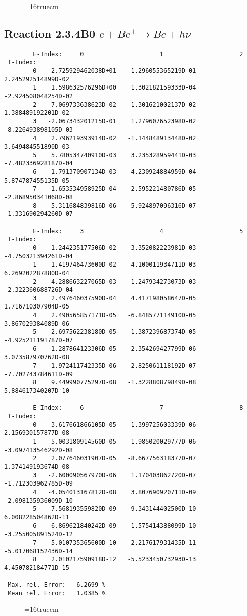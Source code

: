 \documentclass[12pt]{article}
\begin{document}
\begin{figure} \label{2.3.2C}
\epsfxsize=16truecm
\end{figure}
\newpage

\subsection{
Reaction 2.3.4B0  $e + Be^+ \rightarrow Be + h\nu$
}


\begin{small}\begin{verbatim}
        E-Index:     0                     1                     2
 T-Index:
        0   -2.725929462038D+01   -1.296055365219D-01    2.245292514899D-02
        1    1.598632576296D+00    1.302182159333D-04   -2.924508048254D-02
        2   -7.069733638623D-02    1.301621002137D-02    1.388489192201D-02
        3   -2.067343201215D-01    1.279607652398D-02   -8.226493898105D-03
        4    2.796219393914D-02   -1.144848913448D-02    3.649484551890D-03
        5    5.780534740910D-03    3.235328959441D-03   -7.482336928187D-04
        6   -1.791370907134D-03   -4.230924884959D-04    5.874787455135D-05
        7    1.653534958925D-04    2.595221480786D-05   -2.868950341068D-08
        8   -5.311684839816D-06   -5.924897096316D-07   -1.331690294260D-07

        E-Index:     3                     4                     5
 T-Index:
        0   -1.244235177506D-02    3.352082223981D-03   -4.750321394261D-04
        1    1.419746473600D-02   -4.100011934711D-03    6.269202287880D-04
        2   -4.288663227065D-03    1.247934273073D-03   -2.322360688726D-04
        3    2.497646037590D-04    4.417198058647D-05    1.716710307904D-05
        4    2.490565857171D-05   -6.848577114910D-05    3.867029384089D-06
        5   -2.697562238180D-05    1.387239687374D-05   -4.925211191787D-07
        6    1.287864123306D-05   -2.354269427799D-06    3.073587970762D-08
        7   -1.972411742335D-06    2.825061118192D-07   -7.702743784611D-09
        8    9.449990775297D-08   -1.322880879849D-08    5.884617340207D-10

        E-Index:     6                     7                     8
 T-Index:
        0    3.617661866105D-05   -1.399725603339D-06    2.156930157877D-08
        1   -5.003180914560D-05    1.985020029777D-06   -3.097413546292D-08
        2    2.077646031907D-05   -8.667756318377D-07    1.374149193674D-08
        3   -2.600090567970D-06    1.170403862720D-07   -1.712303962785D-09
        4   -4.054013167812D-08    3.807690920711D-09   -2.098135936009D-10
        5   -7.568193559820D-09   -9.343144402500D-10    6.008228504862D-11
        6    6.869621840242D-09   -1.575414388099D-10   -3.255005891524D-12
        7   -5.010735365600D-10    2.217617931435D-11   -5.017068152436D-14
        8    2.010217590918D-12   -5.523345073293D-13    4.450782184771D-15

 Max. rel. Error:   6.2699 %
 Mean rel. Error:   1.0385 %

\end{verbatim}\end{small}
\begin{figure} \label{2.3.4B0}
\epsfxsize=16truecm
\end{figure}
\newpage
\end{document}
